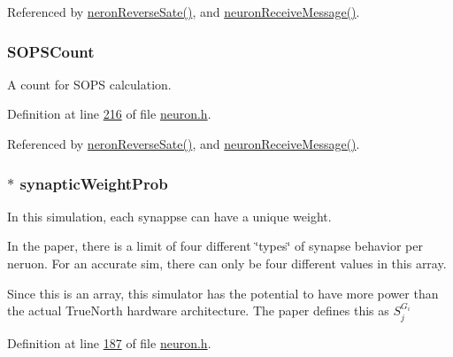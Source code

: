 Referenced by \hyperlink{neuron_8c_source_l00232}{neron\+Reverse\+Sate()}, and \hyperlink{neuron_8c_source_l00103}{neuron\+Receive\+Message()}.

\hypertarget{structneuron_state_a71fbb9a79e8048b473b6e09d29a64bbe}{}
\subsubsection[{S\+O\+P\+S\+Count}]{ S\+O\+P\+S\+Count}\label{structneuron_state_a71fbb9a79e8048b473b6e09d29a64bbe}


A count for S\+O\+P\+S calculation. 



Definition at line \hyperlink{neuron_8h_source_l00216}{216} of file \hyperlink{neuron_8h_source}{neuron.\+h}.



Referenced by \hyperlink{neuron_8c_source_l00232}{neron\+Reverse\+Sate()}, and \hyperlink{neuron_8c_source_l00103}{neuron\+Receive\+Message()}.

\hypertarget{structneuron_state_aa71c0acf1edf08865e1f9729a2414efa}{}
\subsubsection[{synaptic\+Weight\+Prob}]{$\ast$ synaptic\+Weight\+Prob}\label{structneuron_state_aa71c0acf1edf08865e1f9729a2414efa}


In this simulation, each synappse can have a unique weight. 

In the paper, there is a limit of four different \char`\"{}types\char`\"{} of synapse behavior per neruon. For an accurate sim, there can only be four different values in this array.

Since this is an array, this simulator has the potential to have more power than the actual True\+North hardware architecture. The paper defines this as $S_j^{G_i}$ 

Definition at line \hyperlink{neuron_8h_source_l00187}{187} of file \hyperlink{neuron_8h_source}{neuron.\+h}.



